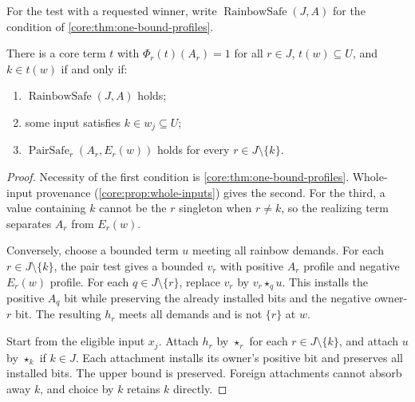 For the test with a requested winner, write
$\operatorname{RainbowSafe}(J,A)$ for the condition of
\cref{core:thm:one-bound-profiles}.

\begin{theorem}\label{core:thm:bounded-query}
There is a core term $t$ with $\Phi_r(t)(A_r)=1$ for all $r\in J$,
$t(w)\subseteq U$, and $k\in t(w)$ if and only if:
\begin{enumerate}
\item $\operatorname{RainbowSafe}(J,A)$ holds;
\item some input satisfies $k\in w_j\subseteq U$;
\item $\operatorname{PairSafe}_r(A_r,E_r(w))$ holds for every
  $r\in J\setminus\{k\}$.
\end{enumerate}
\end{theorem}
\begin{proof}
Necessity of the first condition is \cref{core:thm:one-bound-profiles}.
Whole-input provenance (\cref{core:prop:whole-inputs}) gives the second.
For the third, a value containing $k$ cannot be the $r$ singleton when
$r\ne k$, so the realizing term separates $A_r$ from $E_r(w)$.

Conversely, choose a bounded term $u$ meeting all rainbow demands. For
each $r\in J\setminus\{k\}$, the pair test gives a bounded $v_r$ with positive
$A_r$ profile and negative $E_r(w)$ profile. For each $q\in J\setminus\{r\}$,
replace $v_r$ by $v_r\star_q u$. This installs the positive $A_q$ bit
while preserving the already installed bits and the negative owner-$r$
bit. The resulting $h_r$ meets all demands and is not $\{r\}$ at $w$.

Start from the eligible input $x_j$. Attach $h_r$ by $\star_r$ for each
$r\in J\setminus\{k\}$, and attach $u$ by $\star_k$ if $k\in J$. Each attachment
installs its owner's positive bit and preserves all installed bits.
The upper bound is preserved. Foreign attachments cannot absorb away $k$,
and choice by $k$ retains $k$ directly.
\end{proof}


